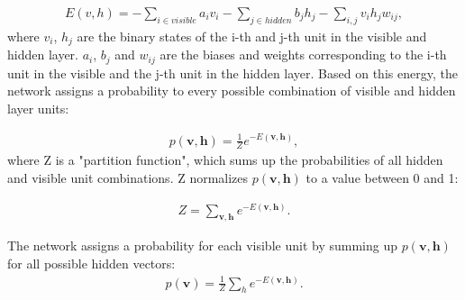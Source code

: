 \begin{equation}
\begin{aligned}
    E(v,h) = -\sum_{i \in visible} a_{i}v_{i}-\sum_{j \in hidden} b_{j}h_{j}-\sum_{i,j} v_{i}h_{j}w_{ij},
\end{aligned}
\end{equation}
where $v_{i}$, $h_{j}$ are the binary states of the i-th and j-th unit in the visible and hidden layer. $a_{i}$, $b_{j}$ and $w_{ij}$ are the biases and weights corresponding to the i-th unit in the visible and the j-th unit in the hidden layer. Based on this energy, the network assigns a probability to every possible combination of visible and hidden layer units:

\begin{equation}
\begin{aligned}
    p(\mathbf{v,h}) = \frac{1}{Z} e^{-E(\mathbf{v,h})},
\end{aligned}
\end{equation}
where Z is a "partition function", which sums up the probabilities of all hidden and visible unit combinations. Z normalizes $p(\mathbf{v,h})$ to a value between 0 and 1:

\begin{equation}
\begin{aligned}
    Z = \sum_{\mathbf{v,h}}e^{-E(\mathbf{v,h})}.
\end{aligned}
\end{equation}

The network assigns a probability for each visible unit by summing up $p(\mathbf{v,h})$ for all possible hidden vectors:
\begin{equation}
\begin{aligned}
    p(\mathbf{v}) = \frac{1}{Z} \sum_{h} e^{-E(\mathbf{v,h})}.
    \label{eq:prob_visible_layer}
\end{aligned}
\end{equation}

